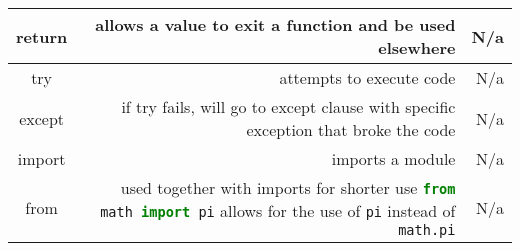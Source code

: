 \documentclass[12pt]{report}
\begin{document}
\begin{tabular}{| c | R | R |}
    \hline
    return & allows a value to exit a function and be used elsewhere & N/a \\
    \hline
    try & attempts to execute code & N/a \\
    \hline
    except & if try fails, will go to except clause with specific exception that broke the code & N/a \\
    \hline
    import & imports a module & N/a \\
    \hline 
    from & used together with imports for shorter use \lstinline[language=Python]!from math import pi! allows for the use of \lstinline[language=Python]!pi! instead of \lstinline[language=Python]!math.pi! & N/a \\
    \hline
\end{tabular}
\end{document}
